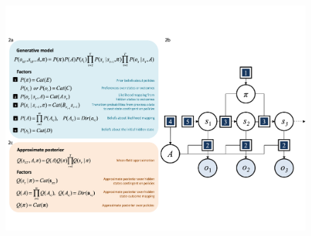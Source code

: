 \documentclass[review,12pt,authoryear]{elsarticle}
\begin{document}
\begin{figure}
    \centering
    \includegraphics[width=\textwidth]{FigureGenMod.png}
\end{figure}
\end{document}
